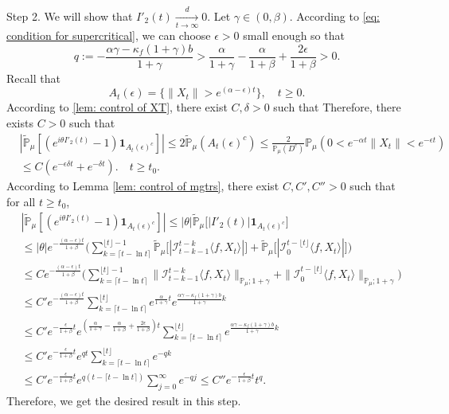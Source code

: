 \documentclass[12pt,a4paper]{amsart}
\theoremstyle{plain}
\theoremstyle{definition}
\numberwithin{equation}{section}
\begin{document}
	Step 2.
	We will show that $I'_2(t)\xrightarrow[t\to \infty]{d} 0$.
	Let $\gamma \in (0,\beta)$.
	According to \eqref{eq: condition for supercritical}, we can choose $\epsilon > 0$ small enough so that
\[
	q:= - \frac{\alpha \gamma-\kappa_f(1+\gamma)b}{1+\gamma}
	> \frac{\alpha}{1+\gamma}-\frac{\alpha}{1+\beta} + \frac{2\epsilon}{1+\beta} > 0.
\]
	Recall that
\[
	 A_t(\epsilon)
	=\{\|X_t\|>e^{(\alpha-\epsilon )t}\},
	\quad t\geq 0.
\]
	According to \eqref{lem: control of XT}, there exist
	$C,\delta>0$ such that
	Therefore, there exists $C>0$ such that
\begin{equation}\begin{split}
    &|\mathbb{\tilde{P}}_{\mu}[(e^{i\theta I'_2(t)}-1)\mathbf{1}_{A_t(\epsilon)^c}]|
    \leq 2\mathbb{\tilde{P}}_{\mu}(A_t(\epsilon)^c)\leq \frac{2}{\mathbb{P}_{\mu}(D^c)}\mathbb{P}_{\mu}(0<e^{-\alpha t}\|X_t\|<e^{-\epsilon t})
    \\&\leq C(e^{-\epsilon\delta t}+e^{-\delta t}).
    \quad t\geq t_0.
\end{split}\end{equation}
	According to Lemma \ref{lem: control of mgtrs}, there exist $C,C',C''>0$ such that for all
	$t\ge t_0$,
\begin{align*}
    &|\mathbb{\tilde{P}}_{\mu} [ (e^{i\theta I'_2(t)}-1)\mathbf{1}_{A_t(\epsilon)^c}]|
    \leq |\theta| \mathbb{\tilde{P}}_{\mu} \big[ |I'_2(t)|\mathbf{1}_{A_t(\epsilon)^c}\big]
    \\&\leq|\theta| e^{-\frac{(\alpha - \epsilon )t}{1+\beta}} \Big(\sum_{k=\lceil t-\ln t \rceil}^{\lfloor t \rfloor - 1}\mathbb{\tilde{P}}_{\mu}\big[| \mathcal{I}_{t-k-1}^{t-k}\langle f,X_t\rangle|\big] + \mathbb{\tilde{P}}_{\mu}\big[| \mathcal{I}_{0}^{t-\lfloor t\rfloor}\langle f,X_t\rangle|\big]\Big)
    \\& \leq C  e^{-\frac{(\alpha - \epsilon )t}{1+\beta}} \Big(\sum_{k=\lceil t-\ln t \rceil}^{\lfloor t \rfloor - 1}\|\mathcal{I}_{t-k-1}^{t-k}\langle f,X_t\rangle\|_{\mathbb P_\mu; 1+\gamma} + \|\mathcal I_0^{t-\lfloor t \rfloor} \langle f, X_t\rangle\|_{\mathbb P_\mu;1+\gamma}\Big)
    \\ &\leq C'  e^{-\frac{(\alpha - \epsilon )t}{1+\beta}} \sum_{k=\lceil t-\ln t \rceil}^{\lfloor t \rfloor}e^{\frac{\alpha}{1+\gamma}t}e^{\frac{\alpha\gamma-\kappa_f(1+\gamma)b}{1+\gamma}k}\\
    &\leq C'  e^{-\frac{\epsilon}{1+\beta} t}e^{(\frac{\alpha }{1+\gamma}-\frac{\alpha }{1+\beta} + \frac{2\epsilon}{1+\beta})t} \sum_{k=\lceil t-\ln t \rceil}^{\lfloor t \rfloor}e^{\frac{\alpha\gamma-\kappa_f(1+\gamma)b}{1+\gamma}k}\\
    &\leq C'  e^{-\frac{\epsilon}{1+\beta} t} e^{qt} \sum_{k=\lceil t-\ln t \rceil}^{\lfloor t \rfloor}e^{-qk}\\
    &\leq C'  e^{-\frac{\epsilon}{1+\beta} t} e^{q(t - \lceil t - \ln t\rceil)} \sum_{j=0}^{\infty}e^{-qj}\leq C'' e^{-\frac{\epsilon}{1+\beta} t} t^q.
\end{align*}
	Therefore, we get the desired result in this step.
\end{document}
